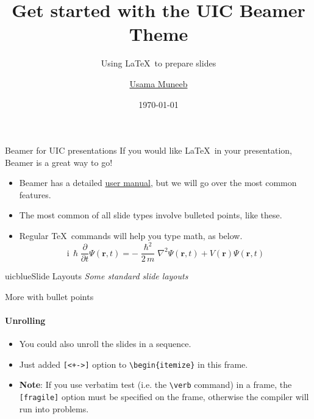\documentclass{beamer}
\title{Get started with the UIC Beamer Theme}
\subtitle{Using \LaTeX\ to prepare slides}
\author{\href{mailto:umunee2@uic.edu}{Usama Muneeb}}
\date{\today}
\newcommand{\hrefcol}[2]{\textcolor{uihteal}{\href{#1}{#2}}}
\begin{document}
\maketitle
{} %



\begin{frame}{Beamer for UIC presentations}
If you would like \LaTeX\ in your presentation, Beamer is a great way to go!
\begin{itemize}
\item Beamer has a detailed
\hrefcol{https://www.ctan.org/tex-archive/macros/latex/contrib/beamer/doc/beameruserguide.pdf}{user
 manual}, but we will go over the most common features.
\item The most common of all slide types involve bulleted points, like these.
\item Regular \TeX\ commands will help you type math, as below.
\begin{equation*}
\mathrm{i}\,\hslash\frac{\partial}{\partial t} \Psi(\mathbf{r},t) = -\frac{\hslash^2}{2\,m}\nabla^2\Psi(\mathbf{r},t) + V(\mathbf{r})\Psi(\mathbf{r},t)
\end{equation*}
\end{itemize}
\end{frame}


\begin{chapter}{uicblue}{Slide Layouts}
\textit{Some standard slide layouts}
\end{chapter}


\begin{frame}[fragile]{More with bullet points}
\framesubtitle{Unrolling}
\begin{itemize}[<+->]
\item You could also unroll the slides in a sequence.
\item Just added \verb|[<+->]| option to \verb|\begin{itemize}| in this frame.
\item \textbf{Note}: If you use verbatim test (i.e. the \verb|\verb| command) in a frame, the \verb|[fragile]| option must be specified on the frame, otherwise the compiler will run into problems.
\end{itemize}
\end{frame}
\end{document}
